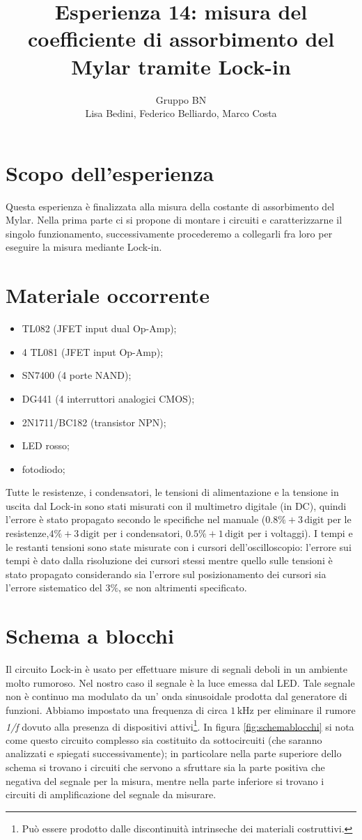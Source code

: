 \documentclass[10pt,a4paper]{article}
\author{Gruppo BN \\ Lisa Bedini, Federico Belliardo, Marco Costa}
\title{Esperienza 14: misura del coefficiente di assorbimento del Mylar tramite Lock-in}
\begin{document}
\maketitle
\section{Scopo dell'esperienza}
Questa esperienza è finalizzata alla misura della costante di assorbimento del Mylar. Nella prima parte ci si propone di montare i circuiti e caratterizzarne il singolo funzionamento, successivamente procederemo a collegarli fra loro per eseguire la misura mediante Lock-in.

\section{Materiale occorrente}
\begin{itemize}
\item TL082 (JFET input dual Op-Amp);
\item 4 TL081 (JFET input Op-Amp);
\item SN7400 (4 porte NAND);
\item DG441 (4 interruttori analogici CMOS);
\item 2N1711/BC182 (transistor NPN);
\item LED rosso;
\item fotodiodo;
\end{itemize}

Tutte le resistenze, i condensatori, le tensioni di alimentazione e la tensione in uscita dal Lock-in sono stati misurati con il multimetro digitale (in DC), quindi l'errore è stato propagato secondo le specifiche nel manuale ($0.8\% + 3\,\mbox{digit}$ per le resistenze,$4\% + 3\, \mbox{digit}$  per i condensatori, $0.5\% + 1\,\mbox{digit}$ per i voltaggi). I tempi e le restanti tensioni sono state misurate con i cursori dell'oscilloscopio: l'errore sui tempi è dato dalla risoluzione dei cursori stessi mentre quello sulle tensioni è stato propagato considerando sia l'errore sul posizionamento dei cursori sia l'errore sistematico del $3\%$, se non altrimenti specificato.

\section{Schema a blocchi}
Il circuito Lock-in è usato per effettuare misure di segnali deboli in un ambiente molto rumoroso. Nel nostro caso il segnale è la luce emessa dal LED. Tale segnale non è continuo ma modulato da un' onda sinusoidale prodotta dal generatore di funzioni. Abbiamo impostato una frequenza di circa $1\,\mbox{kHz}$ per eliminare il rumore \emph{1/f} dovuto alla presenza di dispositivi attivi\footnote{Può essere prodotto dalle discontinuità intrinseche dei materiali costruttivi.}. In figura \ref{fig:schemablocchi} si nota come questo circuito complesso sia costituito da sottocircuiti (che saranno analizzati e spiegati successivamente); in particolare nella parte superiore dello schema si trovano i circuiti che servono a sfruttare sia la parte positiva che negativa del segnale per la misura, mentre nella parte inferiore si trovano i circuiti di amplificazione del segnale da misurare.
\end{document}
